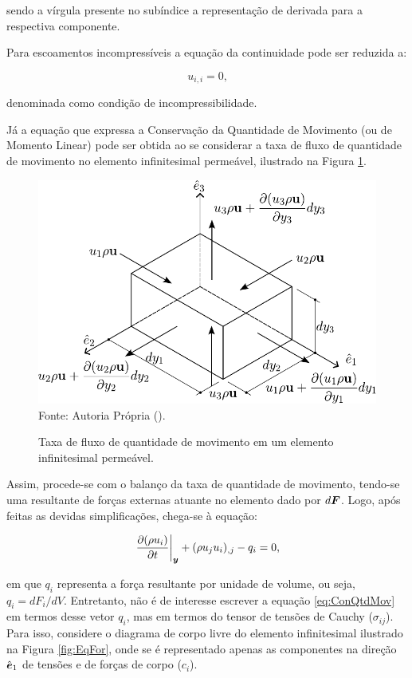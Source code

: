 \noindent sendo a vírgula presente no subíndice a representação de derivada para a respectiva componente.

Para escoamentos incompressíveis a equação da continuidade pode ser reduzida a:

\begin{equation}
    u_{i,i}=0\text{,}\label{eq:incomp}
\end{equation}

\noindent denominada como condição de incompressibilidade.

Já a equação que expressa a Conservação da Quantidade de Movimento (ou de Momento Linear) pode ser obtida ao se considerar a taxa de fluxo de quantidade de movimento no elemento infinitesimal permeável, ilustrado na Figura \ref{fig:ConQtdMov}.

\begin{figure}[h!]
    \centering
    \caption{Taxa de fluxo de quantidade de movimento em um elemento infinitesimal permeável.}
    \includegraphics[width=.55\linewidth]{Figuras/ConQtdMov.pdf}
    \\Fonte: Autoria Própria (\the\year).
    \label{fig:ConQtdMov}
\end{figure}

Assim, procede-se com o balanço da taxa de quantidade de movimento, tendo-se uma resultante de forças externas atuante no elemento dado por $d\boldsymbol{F}$. Logo, após feitas as devidas simplificações, chega-se à equação:

\begin{equation}
    \left.\frac{\partial{(\rho u_i)}}{\partial{t}}\right|_{\boldsymbol{y}}+(\rho u_ju_i)_{,j}-q_i=0\text{,}
    \label{eq:ConQtdMov}
\end{equation}

\noindent em que $q_i$ representa a força resultante por unidade de volume, ou seja, $q_i=dF_i/dV$. Entretanto, não é de interesse escrever a equação \ref{eq:ConQtdMov} em termos desse vetor $q_i$, mas em termos do tensor de tensões de Cauchy ($\sigma_{ij}$). Para isso, considere o diagrama de corpo livre do elemento infinitesimal ilustrado na Figura \ref{fig:EqFor}, onde se é representado apenas as componentes na direção $\hat{\boldsymbol{e}}_1$ de tensões e de forças de corpo ($c_i$).


